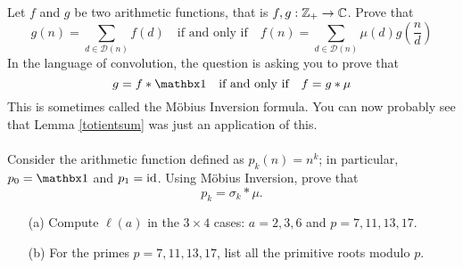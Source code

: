 \vspace*{0.1in}

\begin{problem}\label{Problem 12.2} Let $f$ and $g$ be two arithmetic functions, that is $f,g: \mathbb Z_+ \to \mathbb C$. Prove that
\[g(n) = \sum_{d\in \mathscr{D}(n)}f(d)\quad \text{if and only if}\quad f(n) = \sum_{d\in \mathscr{D}(n)}\mu(d)g\left(\frac{n}{d}\right)\]
In the language of convolution, the question is asking you to prove that
\[g = f * \one \quad \text{if and only if}\quad f = g * \mu\]
This is sometimes called the M{\"o}bius Inversion formula. You can now probably see that Lemma \ref{totientsum} was just an application of this.\\
\\
Consider the arithmetic function defined as $p_k(n) = n^k$; in particular, $p_0 = \one$ and $p_1 = \operatorname{id}$. Using M{\"o}bius Inversion, prove that
\[p_k = \sigma_k * \mu.\]
\end{problem}

\vspace*{0.1in}

\begin{problem}\label{Problem 12.3}\hfill
\begin{itemize}
\item[(a)] Compute $\ell(a)$ in the $3 \times 4$ cases: $a = 2, 3, 6$ and $p = 7, 11, 13, 17$.
\item[(b)] For the primes $p = 7, 11, 13, 17$, list all the primitive roots modulo $p$.
\end{itemize}
\end{problem}